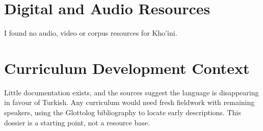 \documentclass[12pt]{article}
\begin{document}
\section{Digital and Audio Resources}
I found no audio, video or corpus resources for Kho'ini.

\section{Curriculum Development Context}
Little documentation exists, and the sources suggest the language is disappearing in favour of Turkish. Any curriculum would need fresh fieldwork with remaining speakers, using the Glottolog bibliography to locate early descriptions. This dossier is a starting point, not a resource base.
\end{document}
